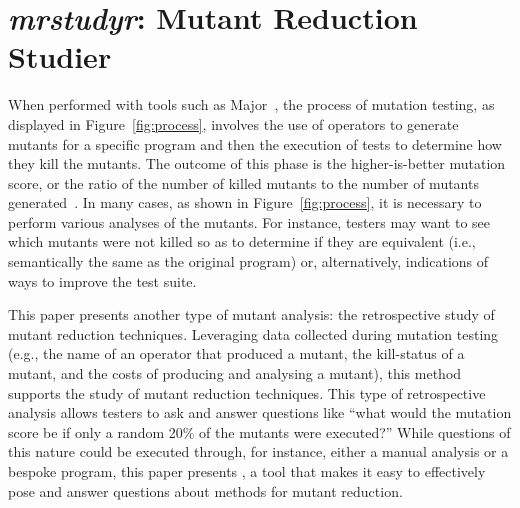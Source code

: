 
\section{\textit{mrstudyr}: Mutant Reduction Studier}





When performed with tools such as Major~\cite{Just2011b}, the process of mutation testing, as displayed in
Figure~\ref{fig:process}, involves the use of operators to generate mutants for a specific program and then the
execution of tests to determine how they kill the mutants. The outcome of this phase is the higher-is-better mutation
score, or the ratio of the number of killed mutants to the number of mutants generated~\cite{Just2011a}. In many cases,
as shown in Figure~\ref{fig:process}, it is necessary to perform various analyses of the mutants. For instance, testers
may want to see which mutants were not killed so as to determine if they are equivalent (i.e., semantically the same as
the original program) or, alternatively, indications of ways to improve the test suite.


This paper presents another type of mutant analysis: the retrospective study of mutant reduction techniques. Leveraging
data collected during mutation testing (e.g., the name of an operator that produced a mutant, the kill-status of a
mutant, and the costs of producing and analysing a mutant), this method supports the study of mutant reduction
techniques. This type of retrospective analysis allows testers to ask and answer questions like ``what would the
mutation score be if only a random 20\% of the mutants were executed?'' While questions of this nature could be executed
through, for instance, either a manual analysis or a bespoke program, this paper presents \mr, a tool that makes it easy
to effectively pose and answer questions about methods for mutant reduction.


